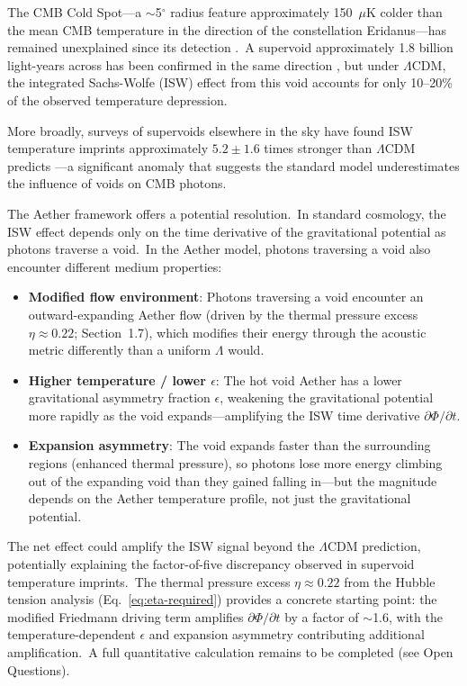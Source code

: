 ﻿\documentclass[12pt,letterpaper]{article}
\begin{document}
The CMB Cold Spot---a $\sim$5$^\circ$ radius feature approximately 150~$\mu$K
colder than the mean CMB temperature in the direction of the constellation
Eridanus---has remained unexplained since its detection \cite{vielva2004}.\ A
supervoid approximately 1.8 billion light-years across has been confirmed in
the same direction \cite{szapudi2015}, but under $\Lambda$CDM, the integrated
Sachs-Wolfe (ISW) effect from this void accounts for only 10--20\% of the
observed temperature depression.

More broadly, surveys of supervoids elsewhere in the sky have found ISW
temperature imprints approximately $5.2 \pm 1.6$ times stronger than $\Lambda$CDM
predicts \cite{kovacs2022}---a significant anomaly that suggests the standard
model underestimates the influence of voids on CMB photons.

The Aether framework offers a potential resolution.\ In standard cosmology, the
ISW effect depends only on the time derivative of the gravitational potential as
photons traverse a void.\ In the Aether model, photons traversing a void also
encounter different medium properties:
%
\begin{itemize}[leftmargin=2em]
  \item \textbf{Modified flow environment}: Photons traversing a void encounter an
    outward-expanding Aether flow (driven by the thermal pressure excess
    $\eta \approx 0.22$; Section~1.7), which modifies their energy through the
    acoustic metric differently than a uniform $\Lambda$ would.

  \item \textbf{Higher temperature / lower $\epsilon$}: The hot void Aether has a
    lower gravitational asymmetry fraction $\epsilon$, weakening the gravitational
    potential more rapidly as the void expands---amplifying the ISW time derivative
    $\partial\Phi/\partial t$.

  \item \textbf{Expansion asymmetry}: The void expands faster than the
    surrounding regions (enhanced thermal pressure), so photons lose more energy
    climbing out of the expanding void than they gained falling in---but the
    magnitude depends on the Aether temperature profile, not just the
    gravitational potential.
\end{itemize}
%
The net effect could amplify the ISW signal beyond the $\Lambda$CDM prediction,
potentially explaining the factor-of-five discrepancy observed in supervoid
temperature imprints.\ The thermal pressure excess $\eta \approx 0.22$ from the
Hubble tension analysis (Eq.~\ref{eq:eta-required}) provides a concrete starting
point: the modified Friedmann driving term amplifies $\partial\Phi/\partial t$
by a factor of $\sim$1.6, with the temperature-dependent $\epsilon$ and
expansion asymmetry contributing additional amplification.\ A full quantitative
calculation remains to be completed (see Open Questions).
\end{document}
